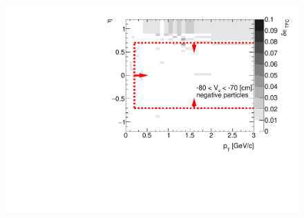 \begin{figure}[H]\ContinuedFloat
	\vspace{-3.5em}
	\parbox{0.325\textwidth}{
		\includegraphics[width=\linewidth,page=16]{graphics/systematicsEfficiency/deadMaterial/secondaries_Unbinned_Charged_SDCD.pdf}\\
	}~
	\vspace{-4em}
\end{figure}
